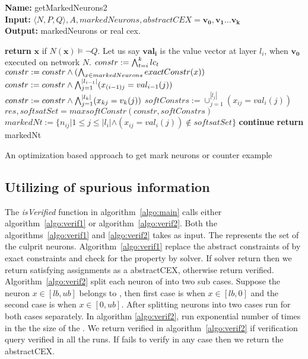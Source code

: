\begin{algorithm}[t]
  \textbf{Name: } getMarkedNeurons2 \\
  \textbf{Input: } $\langle N,P,Q \rangle,A,markedNeurons,abstractCEX = \boldsymbol{v_0}, \boldsymbol{v_1} ... \boldsymbol{v_k}$\\
  \textbf{Output: } markedNeurons or real cex. 
  \begin{algorithmic}[1]
    \State \textbf{return} $\boldsymbol{x}$ if $N(\boldsymbol{x}) \models \neg Q$. 
    \State Let us say $\boldsymbol{val_{i}}$ is the value vector at layer $l_i$, when $\boldsymbol{v_0}$ executed on network $N$. 
     
        \State $constr := \bigwedge_{t=i}^k lc_t$
        \State $constr := constr \land (\bigwedge_{x \in markedNeurons} exactConstr(x))$ 
        \State $constr := constr \land \bigwedge_{j=1}^{|l_{i-1}|} (x_{(i-1)j} = val_{i-1}(j))$
        \State $constr := constr \land \bigwedge_{j=1}^{|l_k|} (x_{kj} = v_k(j))$
        \State $softConstrs := \cup_{j=1}^{|l_j|} (x_{ij} = val_i(j))$
        \State $res, softsatSet = maxsoftConstr(constr, softConstrs)$ 
        \State $markedNt := \{n_{ij} | 1 \leq j \leq |l_i| \land (x_{ij} = val_i(j)) \notin  softsatSet\}$ 
          \State \textbf{continue}
        \Else
          \State \textbf{return} markedNt
        \EndIf 
      \EndIf
    \EndFor
  \end{algorithmic}
  \caption{An optimization based approach to get mark neurons or counter example}
  \label{algo:refine2}
\end{algorithm}

\subsection{Utilizing of spurious information}
The \emph{isVerified} function in algorithm~\ref{algo:main} calls either algorithm~\ref{algo:verif1} or algorithm~\ref{algo:verif2}. 
Both the algorithms~\ref{algo:verif1} and \ref{algo:verif2} takes \markednewrons{} as input. 
The \markednewrons{} represents the set of the culprit neurons. 
Algorithm~\ref{algo:verif1} replace the abstract constraints of \markednewrons{} by exact constraints and check for the 
property by \milp{} solver. If \milp{} solver return \sat{} then we return satisfying assignments as a abstractCEX, 
otherwise return verified. Algorithm~\ref{algo:verif2} split each neuron of \markednewrons{} into two sub cases. Suppose the 
neuron $x\in [lb,ub]$ belongs to \markednewrons{}, then first case is when $x \in [lb,0]$ and the second case is when $x \in [0,ub]$.   
After splitting neurons into two cases \deeppoly{} run for both cases separately. In algorithm \ref{algo:verif2}, \deeppoly{}
run exponential number of times in the the size of the \markednewrons{}. We return verified in algorithm~\ref{algo:verif2} if 
verification query verified in all the \deeppoly{} runs. If \deeppoly{} fails to verify in any case then we return the abstractCEX. 



